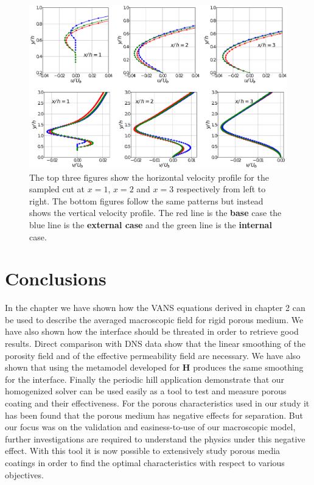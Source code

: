 \begin{figure}[H]
	\centering
	\includegraphics[width=1\linewidth]{chapter_5/figure/cuts_hill}
	\caption{The top three figures show the horizontal velocity profile for the sampled cut at $x=1$, $x=2$ and $x=3$ respectively from left to right. The bottom figures follow the same patterns but instead shows the vertical velocity profile. The red line is the \textbf{base} case the blue line is the \textbf{external case} and the green line is the \textbf{internal} case.}
	\label{fig:cuts_hill}
\end{figure}


\section{Conclusions}

In the chapter we have shown how the VANS equations derived in chapter 2 can be used to describe the averaged macroscopic field for rigid porous medium. We have also shown how the interface should be threated in order to retrieve good results. Direct comparison with DNS data show that the linear smoothing of the porosity field and of the effective permeability field are necessary. We have also shown that using the metamodel developed for $\mathbf{H}$ produces the same smoothing for the interface. Finally the periodic hill application demonstrate that our homogenized solver can be used easily as a tool to test and measure porous coating and their effectiveness.
For the porous characteristics used in our study it has been found that the porous medium has negative effects for separation. But our focus was on the validation and easiness-to-use of our macroscopic model, further investigations are required to understand the physics under this negative effect. With this tool it is now possible to extensively study porous media coatings in order to find the optimal characteristics with respect to various objectives.
